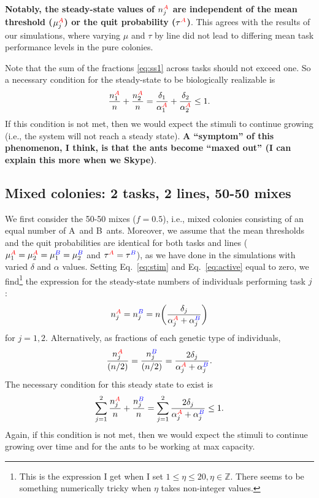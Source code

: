 \documentclass[10pt]{article}
\newcommand{\ZZ}{\mathbb{Z}}
\newcommand{\A}{{\color{red}A}}
\newcommand{\B}{{\color{blue}B}}
\begin{document}
\textbf{Notably, the steady-state values of $n_j^{\A}$ are \textbf{independent} of the mean threshold ($\mu_j^{\A}$) or the quit probability ($\tau^{\A}$)}. This agrees with the results of our simulations, where varying $\mu$ and $\tau$ by line did not lead to differing mean task performance levels in the pure colonies.

Note that the sum of the fractions \eqref{eq:ss1} across tasks should not exceed one. So a necessary condition for the steady-state to be biologically realizable is 
\begin{equation}
    \frac{n_1^{\A}}{n} + \frac{n_2^{\A}}{n} = \frac{\delta_1}{\alpha_1^{\A}} + \frac{\delta_2}{\alpha_2^{\A} }\leq 1 \label{eq:cond1}.
\end{equation}
If this condition is not met, then we would expect the stimuli to continue growing (i.e., the system will not reach a steady state). \textbf{A ``symptom'' of this phenomenon, I think, is that the ants become ``maxed out'' (I can explain this more when we Skype)}.

\subsection{Mixed colonies: 2 tasks, 2 lines, 50-50 mixes}

{\color{black}We first consider the 50-50 mixes ($f=0.5$), i.e., mixed colonies consisting of an equal number of \A\ and \B\ ants.}
Moreover, we assume that the mean thresholds and the quit probabilities are identical for both tasks and lines ($\mu_1^{\A} = \mu_2^{\A} = \mu_1^{\B} = \mu_2^{\B}$ and $\tau^{\A} = \tau^{\B}$), as we have done in the simulations with varied $\delta$ and $\alpha$ values. Setting Eq.~\eqref{eq:stim} and Eq.~\eqref{eq:active} equal to zero, we find\footnote{This is the expression I get when I set $1\leq \eta \leq 20, \eta \in \ZZ$. There seems to be something numerically tricky when $\eta$ takes non-integer values.} the expression for the steady-state numbers of individuals performing task $j$:%
\begin{equation}
     n_j^{\A} =  n_j^{\B} = n\bigg(\frac{\delta_j}{\alpha_j^{\A} + \alpha_j^{\B}}\bigg) \label{eq:ss2a}
\end{equation}
for $j = 1, 2$.
Alternatively, as fractions of each genetic type of individuals,
\begin{equation}
     \frac{n_j^{\A}}{(n/2)} =  \frac{n_j^{\B}}{(n/2)} = \frac{2\delta_j}{\alpha_j^{\A} + \alpha_j^{\B}}. \label{eq:ss2}
\end{equation}
The necessary condition for this steady state to exist is
\begin{equation}
     \sum_{j=1}^2 \frac{n_j^{\A}}{n} + \frac{n_j^{\B}}{n} 
     = \sum_{j=1}^2 \frac{2\delta_j}{\alpha_j^{\A} + \alpha_j^{\B}}
     \leq 1.
     \label{eq:cond2}
\end{equation}
Again, if this condition is not met, then we would expect the stimuli to continue growing over time and for the ants to be working at max capacity.
\end{document}
